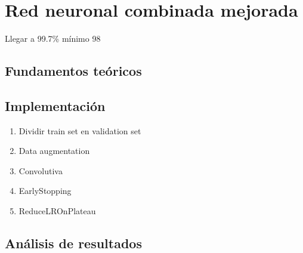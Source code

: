 \section{Red neuronal combinada mejorada}

Llegar a 99.7\% mínimo 98

\subsection{Fundamentos teóricos}

\subsection{Implementación}

\begin{enumerate}
	\item Dividir train set en validation set
	\item Data augmentation
	\item Convolutiva
	\item EarlyStopping
	\item ReduceLROnPlateau
\end{enumerate}


\subsection{Análisis de resultados}


